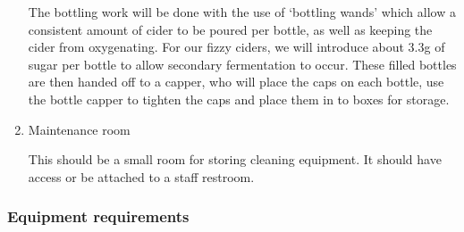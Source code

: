 \documentclass[11pt]{article}
\begin{document}
\begin{enumerate}
The bottling work will be done with the use of `bottling wands' which allow a 
consistent amount of cider to be poured per bottle, as well as keeping the cider 
from oxygenating. For our fizzy ciders, we will introduce about 3.3g of sugar 
per bottle to allow secondary fermentation to occur. These filled bottles are 
then handed off to a capper, who will place the caps on each bottle, use the
bottle capper to tighten the caps and place them in to boxes for storage.

  \item Maintenance room

This should be a small room for storing cleaning equipment. It should have
access or be attached to a staff restroom.
  \end{enumerate}

    \subsubsection{Equipment requirements}
\end{document}
